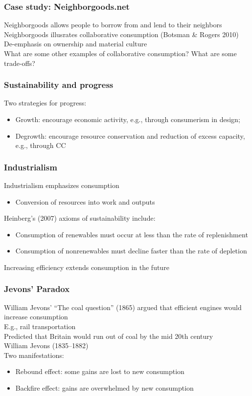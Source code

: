 \documentclass{article}
\begin{document}
\subsubsection*{Case study: Neighborgoods.net}
\label{ssub:case_study_neighborgoods_net}
Neighborgoods allows people to borrow from and lend to their neighbors\\
Neighborgoods illusrates collaborative consumption (Botsman \& Rogers 2010)\\
De-emphasis on ownership and material culture\\
What are some other examples of collaborative consumption? What are some trade-offs?\\
\subsubsection*{Sustainability and progress}
\label{ssub:sustainability_and_progress}
Two strategies for progress:
\begin{itemize}
	\item Growth: encourage economic activity, e.g., through consumerism in design;\\
	\item Degrowth: encourage resource conservation and reduction of excess capacity, e.g., through CC\\
\end{itemize}
\subsubsection*{Industrialism}
\label{ssub:industrialism}
Industrialism emphasizes consumption
\begin{itemize}
	\item Conversion of resources into work and outputs
\end{itemize}
Heinberg’s (2007) axioms of sustainability include:
\begin{itemize}
	\item Consumption of renewables must occur at less than the rate of replenishment
	\item Consumption of nonrenewables must decline faster than the rate of depletion
\end{itemize}
Increasing efficiency extends consumption in the future\\
\subsubsection*{Jevons’ Paradox}
\label{ssub:jevons_paradox}
William Jevons’ “The coal question” (1865) argued that efficient engines would increase consumption\\
E.g., rail transportation\\
Predicted that Britain would run out of coal by the mid 20th century\\
William Jevons (1835–1882)\\
Two manifestations:
\begin{itemize}
	\item Rebound effect: some gains are lost to new consumption
	\item Backfire effect: gains are overwhelmed by new consumption
\end{itemize}
\end{document}
